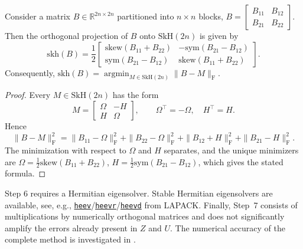 \documentclass[final,onefignum,onetabnum,dvipsnames]{siamart251216}
\numberwithin{algorithm}{section}
\numberwithin{equation}{section}
\DeclareMathOperator*{\argmin}{\mathrm{argmin}}
\begin{document}
\begin{lemma}
\label{thm:nearest_skh}
Consider a matrix $B \in \mathbb R^{2n\times2n}$ partitioned into $n\times n$ blocks,
$
    B=
    \begin{bmatrix}
        B_{11}&B_{12}\\
        B_{21}&B_{22}
    \end{bmatrix}.
$ 
Then the orthogonal projection of $B$ onto $\mathrm{SkH}(2n)$ is given by
\[
    \mathrm{skh}(B)
    =
    \frac12
    \begin{bmatrix}
        \mathrm{skew}(B_{11}+B_{22})
        &
        -\mathrm{sym}(B_{21}-B_{12})
        \\
        \mathrm{sym}(B_{21}-B_{12})
        &
        \mathrm{skew}(B_{11}+B_{22})
    \end{bmatrix}.
\]
Consequently,
$    \mathrm{skh}(B)
    =
    \argmin_{M\in\mathrm{SkH}(2n)}
    \|B-M\|_{\mathrm F}.
$
\end{lemma}

\begin{proof}
Every $M\in\mathrm{SkH}(2n)$ has the form
\[
    M=
    \begin{bmatrix}
        \Omega&-H\\
        H&\Omega
    \end{bmatrix},
    \qquad
    \Omega^\top=-\Omega,
    \quad
    H^\top=H.
\]
Hence
\[
    \|B-M\|_{\mathrm F}^2
    =
    \|B_{11}-\Omega\|_{\mathrm F}^2
    +\|B_{22}-\Omega\|_{\mathrm F}^2 
    +\|B_{12}+H\|_{\mathrm F}^2
    +\|B_{21}-H\|_{\mathrm F}^2.
\]
The minimization with respect to $\Omega$ and $H$ separates, and the
unique minimizers are
$
    \Omega
    =
    \frac12\mathrm{skew}(B_{11}+B_{22})$,
    $H
    =
    \frac12\mathrm{sym}(B_{21}-B_{12})$,
which gives the stated formula.
\end{proof}


Step 6 requires a Hermitian eigensolver. Stable Hermitian eigensolvers are available, see, e.g., \href{https://www.netlib.org/lapack/explore-html/d8/d1c/group__heev_gabba143a47eee873cbdb00d685fca08a3.html#gabba143a47eee873cbdb00d685fca08a3}{\texttt{heev}}/\href{https://www.netlib.org/lapack/explore-html/d1/d56/group__heevr_ga5b40f20c2f8ddaeba9345489b408f94e.html#ga5b40f20c2f8ddaeba9345489b408f94e}{\texttt{heevr}}/\href{https://www.netlib.org/lapack/explore-html/d8/d30/group__heevd_ga67c8efc78670b5cf75bb7018ec519a14.html#ga67c8efc78670b5cf75bb7018ec519a14}{\texttt{heevd}} from LAPACK. Finally,
Step~7 consists of
multiplications by numerically orthogonal matrices and does not
significantly amplify the errors already present in $Z$ and $U$.
The numerical accuracy of the complete method is investigated in
.
\end{document}

